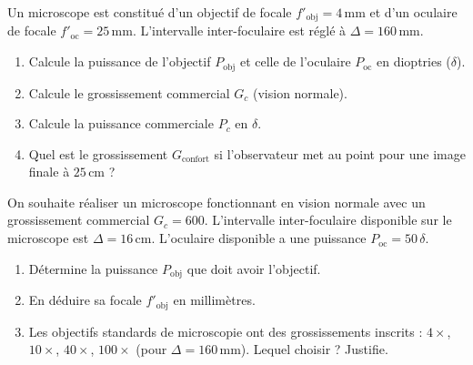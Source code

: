\documentclass[11pt]{article}
\newcounter{popsec}
\newcounter{popsub}
\newcommand{\courssub}[1]{%
  \stepcounter{popsub}%
  \par\vspace{9pt}\noindent{\popxbold\fontsize{11.5}{13}\selectfont\color{popink}{\color{poporange}\thepopsec.\thepopsub}\hspace{6pt}#1}\par\nopagebreak\vspace{4pt}
}
\begin{document}
\begin{exercice}
Un microscope est constitué d'un objectif de focale $f'_{\text{obj}} = 4\,\text{mm}$ et d'un oculaire de focale $f'_{\text{oc}} = 25\,\text{mm}$. L'intervalle inter-foculaire est réglé à $\Delta = 160\,\text{mm}$.
\begin{enumerate}
    \item Calcule la puissance de l'objectif $P_{\text{obj}}$ et celle de l'oculaire $P_{\text{oc}}$ en dioptries ($\delta$).
    \item Calcule le grossissement commercial $G_c$ (vision normale).
    \item Calcule la puissance commerciale $P_c$ en $\delta$.
    \item Quel est le grossissement $G_{\text{confort}}$ si l'observateur met au point pour une image finale à $25\,\text{cm}$ ?
\end{enumerate}
\end{exercice}

\courssub{Je m'entraîne}

\begin{exercice}
On souhaite réaliser un microscope fonctionnant en vision normale avec un grossissement commercial $G_c = 600$. L'intervalle inter-foculaire disponible sur le microscope est $\Delta = 16\,\text{cm}$. L'oculaire disponible a une puissance $P_{\text{oc}} = 50\,\delta$.
\begin{enumerate}
    \item Détermine la puissance $P_{\text{obj}}$ que doit avoir l'objectif.
    \item En déduire sa focale $f'_{\text{obj}}$ en millimètres.
    \item Les objectifs standards de microscopie ont des grossissements inscrits : $4\times$, $10\times$, $40\times$, $100\times$ (pour $\Delta = 160\,\text{mm}$). Lequel choisir ? Justifie.
\end{enumerate}
\end{exercice}
\end{document}
